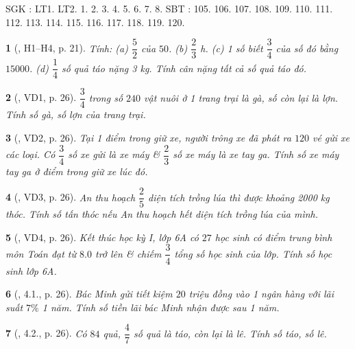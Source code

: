 \documentclass{article}
\newtheorem{baitoan}{}
\begin{document}
\noindent SGK \cite[Chap. V, \S10, pp. 67--70]{SGK_Toan_6_Canh_Dieu_tap_2}: LT1. LT2. 1. 2. 3. 4. 5. 6. 7. 8. SBT \cite[Chap. V, \S10, pp. 57--59]{SBT_Toan_6_Canh_Dieu_tap_2}: 105. 106. 107. 108. 109. 110. 111. 112. 113. 114. 115. 116. 117. 118. 119. 120.

\begin{baitoan}[\cite{Binh_boi_duong_Toan_6_tap_2}, H1--H4, p. 21]
	Tính: (a) $\dfrac{5}{2}$ của $50$. (b) $\dfrac{2}{3}$ {\rm h}. (c) 1 số biết $\dfrac{3}{4}$ của số đó bằng $15000$. (d) $\dfrac{1}{4}$ số quả táo nặng {\rm3 kg}. Tính cân nặng tất cả số quả táo đó.
\end{baitoan}

\begin{baitoan}[\cite{Binh_boi_duong_Toan_6_tap_2}, VD1, p. 26]
	$\dfrac{3}{4}$ trong số $240$ vật nuôi ở 1 trang trại là gà, số còn lại là lợn. Tính số gà, số lợn của trang trại.
\end{baitoan}

\begin{baitoan}[\cite{Binh_boi_duong_Toan_6_tap_2}, VD2, p. 26]
	Tại 1 điểm trong giữ xe, người trông xe đã phát ra $120$ vé gửi xe các loại. Có $\dfrac{3}{4}$ số xe gửi là xe máy \& $\dfrac{2}{3}$ số xe máy là xe tay ga. Tính số xe máy tay ga ở điểm trong giữ xe lúc đó.
\end{baitoan}

\begin{baitoan}[\cite{Binh_boi_duong_Toan_6_tap_2}, VD3, p. 26]
	An thu hoạch $\dfrac{2}{5}$ diện tích trồng lúa thì được khoảng {\rm2000 kg} thóc. Tính số tấn thóc nếu An thu hoạch hết diện tích trồng lúa của mình.
\end{baitoan}

\begin{baitoan}[\cite{Binh_boi_duong_Toan_6_tap_2}, VD4, p. 26]
	Kết thúc học kỳ I, lớp 6A có $27$ học sinh có điểm trung bình môn Toán đạt từ $8.0$ trở lên \& chiếm $\dfrac{3}{4}$ tổng số học sinh của lớp. Tính số học sinh lớp 6A.
\end{baitoan}

\begin{baitoan}[\cite{Binh_boi_duong_Toan_6_tap_2}, 4.1., p. 26]
	Bác Minh gửi tiết kiệm $20$ triệu đồng vào 1 ngân hàng với lãi suất $7\%$ 1 năm. Tính số tiền lãi bác Minh nhận được sau 1 năm.
\end{baitoan}

\begin{baitoan}[\cite{Binh_boi_duong_Toan_6_tap_2}, 4.2., p. 26]
	Có $84$ quả, $\dfrac{4}{7}$ số quả là táo, còn lại là lê. Tính số táo, số lê.
\end{baitoan}
\end{document}
